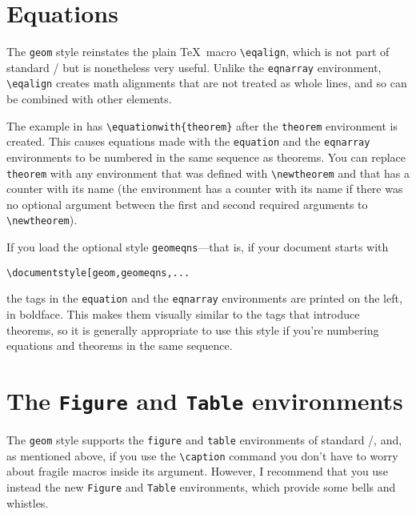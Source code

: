 \section{Equations}

The \verb+geom+ style reinstates the plain \TeX\ macro
\verb+\eqalign+, which is not part of standard \latex/ but is
nonetheless very useful.  Unlike the \verb+eqnarray+ environment,
\verb+\eqalign+ creates math alignments that are not treated as whole
lines, and so can be combined with other elements.

The example in  has
\verb+\equationwith{theorem}+ after the \verb+theorem+
environment is created.  
This causes equations made with the \verb+equation+ and
the \verb+eqnarray+ environments to be numbered in the same sequence
as theorems.  You can replace \verb+theorem+ with any environment that
was defined with \verb+\newtheorem+ and that has a counter with its name
(the environment has a counter with its name if 
there was no optional argument between
the first and second required arguments to \verb+\newtheorem+).

If you load the optional style \verb+geomeqns+---that is,
if your document starts with
\begin{verbatim}
\documentstyle[geom,geomeqns,...
\end{verbatim}
the tags in the \verb+equation+ and the \verb+eqnarray+ environments
are printed on the left, in boldface.  This makes them visually
similar to the tags that introduce theorems, so it is generally
appropriate to use this style if you're numbering equations and
theorems in the same sequence.

\section{The {\mediumseries \tt Figure} and {\mediumseries \tt Table} environments}

The \verb+geom+ style supports the \verb+figure+ and \verb+table+
environments of standard \latex/, and, as mentioned above, if you use
the \verb+\caption+ command you don't have to worry about fragile
macros inside its argument.  However, I recommend that you use
instead the new \verb+Figure+ and \verb+Table+ environments, which
provide some bells and whistles.

